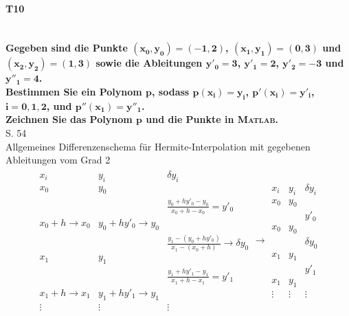 \documentclass[10pt,a4paper]{article}
\begin{document}
	
	\clearpage
	
	
	\paragraph{T10}\mbox{}\\
	\textbf{%
		Gegeben sind die Punkte $\pmb{(x_0,y_0)=(-1,2)}$, $\pmb{(x_1,y_1)=(0,3)}$ und $\pmb{(x_2,y_2)=(1,3)}$ sowie die Ableitungen $\pmb{y'_0=3}$, $\pmb{y'_1=2}$, $\pmb{y'_2=-3}$ und $\pmb{y''_1=4}$.\\
		Bestimmen Sie ein Polynom $\pmb{p}$, sodass $\pmb{p(x_i)=y_i}$, $\pmb{p'(x_i)=y'_i}$, $\pmb{i=0,1,2}$, und $\pmb{p''(x_1)=y''_1}$.\\
		Zeichnen Sie das Polynom $\pmb{p}$ und die Punkte in {\scshape Matlab}.
	}\\
	S. 54 \\
	Allgemeines Differenzenschema für Hermite-Interpolation mit gegebenen Ableitungen vom Grad 2
	\begin{align*}
	\begin{array}{ll|c}
		x_i                   & y_i                       &                        \delta y_i                        \\ \hline
		x_0                   & y_0                       &  \\
		                      &                           &          \frac{y_0+hy'_0-y_0}{x_0+h-x_0} = y'_0          \\
		x_0+h \rightarrow x_0 & y_0+hy'_0 \rightarrow y_0 &  \\
		                      &                           & \frac{y_1-(y_0+hy'_0)}{x_1-(x_0+h)}\rightarrow\delta y_0 \\
		x_1                   & y_1                       &  \\
		                      &                           &          \frac{y_1+hy'_1-y_1}{x_1+h-x_1} = y'_1          \\
		x_1+h \rightarrow x_1 & y_1+hy'_1 \rightarrow y_1 &  \\
		\vdots                & \vdots                    &                          \vdots
	\end{array} \rightarrow
		\begin{array}{ll|c}
			x_i    & y_i    & \delta y_i \\ \hline
			x_0    & y_0    &  \\
			       &        &    y'_0    \\
			x_0    & y_0    &  \\
			       &        & \delta y_0 \\
			x_1    & y_1    &  \\
			       &        &    y'_1    \\
			x_1    & y_1    &  \\
			\vdots & \vdots &   \vdots
		\end{array}
	\end{align*}
\end{document}
